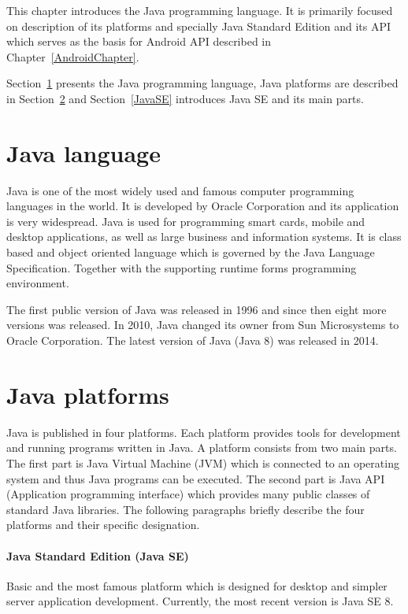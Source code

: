 This chapter introduces the Java programming language. It is primarily focused on description of its platforms and specially Java Standard Edition and its API which serves as the basis for Android API described in Chapter~\ref{AndroidChapter}. 

Section~\ref{JavaLang} presents the Java programming language, Java platforms are described in Section~\ref{JavaPlatforms} and Section~\ref{JavaSE} introduces Java SE and its main parts.

\section{Java language}\label{JavaLang}
Java \cite{JavaBook, Java6Doc} is one of the most widely used and famous computer programming languages in the world. It is developed by Oracle Corporation and its application is very widespread. Java is used for programming smart cards, mobile and desktop applications, as well as large business and information systems. It is class based and object oriented language which is governed by the Java Language Specification. Together with the supporting runtime forms programming environment.

The first public version of Java was released in 1996 and since then eight more versions was released. In 2010, Java changed its owner from Sun Microsystems to Oracle Corporation. The latest version of Java (Java 8) was released in 2014.

\section{Java platforms}\label{JavaPlatforms}
Java is published in four platforms. Each platform provides tools for development and running programs written in Java. A platform consists from two main parts. The first part is Java Virtual Machine (JVM) which is connected to an operating system and thus Java programs can be executed. The second part is Java API (Application programming interface) which provides many public classes of standard Java libraries. The following paragraphs briefly describe the four platforms and their specific designation.

\paragraph{Java Standard Edition (Java SE)}
Basic and the most famous platform which is designed for desktop and simpler server application development. Currently, the most recent version is Java SE 8.

